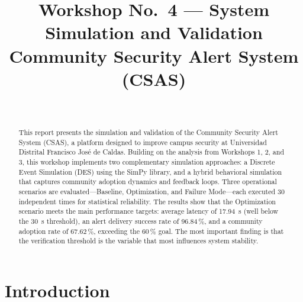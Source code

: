 \documentclass[conference,a4paper,10pt]{IEEEtran}
\begin{document}
\title{\textbf{Workshop No.~4 --- System Simulation and Validation}\\
{\large Community Security Alert System (CSAS)}}

\author{
\\
}
\maketitle

\begin{abstract}
This report presents the simulation and validation of the Community
Security Alert System (CSAS), a platform designed to improve campus
security at Universidad Distrital Francisco Jos\'e de Caldas. Building
on the analysis from Workshops 1, 2, and 3, this workshop implements
two complementary simulation approaches: a Discrete Event Simulation
(DES) using the SimPy library, and a hybrid behavioral simulation that
captures community adoption dynamics and feedback loops. Three
operational scenarios are evaluated---Baseline, Optimization, and
Failure Mode---each executed 30 independent times for statistical
reliability. The results show that the Optimization scenario meets
the main performance targets: average latency of 17.94~s (well below
the 30~s threshold), an alert delivery success rate of 96.84\,\%, and
a community adoption rate of 67.62\,\%, exceeding the 60\,\% goal.
The most important finding is that the verification threshold is
the variable that most influences system stability.
\end{abstract}

\section{Introduction}
\end{document}
